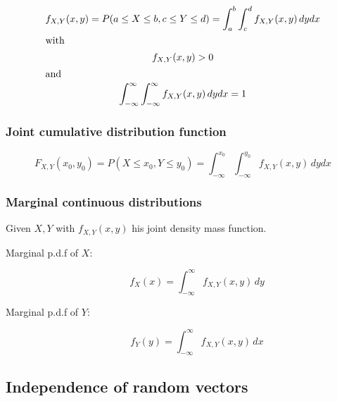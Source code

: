 \begin{gather*}
    f_{X,Y}(x,y)=P(a\leq X \leq b, c\leq Y \leq d) = \int_{a}^b\int_{c}^df_{X,Y}
    (x,y)\,dydx\\
    \intertext{with}
    f_{X,Y}(x,y)>0\\
    \intertext{and}
    \int_{-\infty}^\infty\int_{-\infty}^\infty f_{X,Y}(x,y)\,dydx=1
\end{gather*}

\subsubsection{Joint cumulative distribution function} %
\label{ssub:joint_cumulative_distribution_function}

\begin{equation*}
    F_{X,Y}(x_0,y_0)=P(X\leq x_0,Y\leq y_0) = \int_{-\infty}^{x_0}\int_{-\infty}
    ^{y_0}f_{X,Y}(x,y)\,dydx
\end{equation*}

\subsubsection{Marginal continuous distributions} %
\label{ssub:marginal_continuous_distributions}

Given $X, Y$ with $f_{X,Y}(x,y)$ his joint density mass function.
\begin{description}
    \item[Marginal p.d.f of $X$:]
    \begin{equation*}
        f_X(x)=\int_{-\infty}^\infty f_{X,Y}(x,y)\,dy
    \end{equation*}
    \item[Marginal p.d.f of $Y$:]
    \begin{equation*}
        f_Y(y)=\int_{-\infty}^\infty f_{X,Y}(x,y)\,dx
    \end{equation*}
\end{description}


\subsection{Independence of random vectors} %
\label{sub:independence_of_random_vectors}

